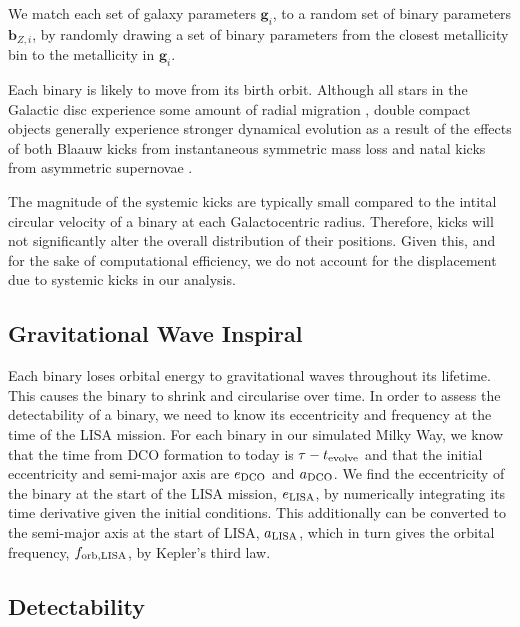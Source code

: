 \documentclass[twocolumn]{aastex63}
\begin{document}
We match each set of galaxy parameters $\mathbf{g}_{{i}}$, to a random set of binary parameters $\mathbf{b}_{{Z, i}}$, by randomly drawing a set of binary parameters from the closest metallicity bin to the metallicity in $\mathbf{g}_{{i}}$.

Each binary is likely to move from its birth orbit. Although all stars in the Galactic disc experience some amount of radial migration \citep{Sellwood&Binney2002, Frankel+2018}, double compact objects generally experience stronger dynamical evolution as a result of the effects of both Blaauw kicks from instantaneous symmetric mass loss \citep{Blaauw1961} and natal kicks from asymmetric supernovae \citep{Hobbs+2005}.

The magnitude of the systemic kicks are typically small compared to the intital circular velocity of a binary at each Galactocentric radius. Therefore, kicks will not significantly alter the overall distribution of their positions. Given this, and for the sake of computational efficiency, we do not account for the displacement due to systemic kicks in our analysis.

\subsection{Gravitational Wave Inspiral}

Each binary loses orbital energy to gravitational waves throughout its lifetime. This causes the binary to shrink and circularise over time. In order to assess the detectability of a binary, we need to know its eccentricity and frequency at the time of the LISA mission. For each binary in our simulated Milky Way, we know that the time from DCO formation to today is $\tau - t_{\rm evolve}$ and that the initial eccentricity and semi-major axis are $e_{\rm DCO}$ and $a_{\rm DCO}$. We find the eccentricity of the binary at the start of the LISA mission, $e_{\rm LISA}$, by numerically integrating its time derivative \citep[][Eq. 5.13]{Peters1964} given the initial conditions. This additionally can be converted to the semi-major axis at the start of LISA, $a_{\rm LISA} $\citep[][Eq. 5.11]{Peters1964}, which in turn gives the orbital frequency, $f_{\rm orb, LISA}$, by Kepler's third law.

\subsection{Detectability}
\end{document}
